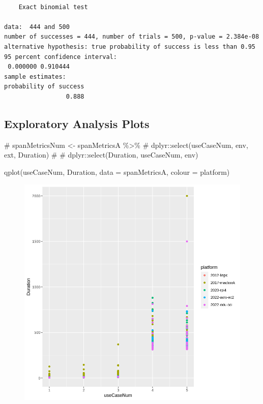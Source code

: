 \documentclass[
  letterpaper,
  DIV=11,
  numbers=noendperiod]{scrartcl}
\newenvironment{Shaded}{\begin{snugshade}}{\end{snugshade}}
\newcommand{\AttributeTok}[1]{\textcolor[rgb]{0.40,0.45,0.13}{#1}}
\newcommand{\CommentTok}[1]{\textcolor[rgb]{0.37,0.37,0.37}{#1}}
\newcommand{\FunctionTok}[1]{\textcolor[rgb]{0.28,0.35,0.67}{#1}}
\newcommand{\NormalTok}[1]{\textcolor[rgb]{0.00,0.23,0.31}{#1}}
\begin{document}
\begin{verbatim}

    Exact binomial test

data:  444 and 500
number of successes = 444, number of trials = 500, p-value = 2.384e-08
alternative hypothesis: true probability of success is less than 0.95
95 percent confidence interval:
 0.000000 0.910444
sample estimates:
probability of success 
                 0.888 
\end{verbatim}

\hypertarget{exploratory-analysis-plots}{%
\subsection{Exploratory Analysis
Plots}\label{exploratory-analysis-plots}}

\begin{Shaded}
\begin{Highlighting}[]
\CommentTok{\# spanMetricsNum \textless{}{-} spanMetricsA \%\textgreater{}\%}
\CommentTok{\#     dplyr::select(useCaseNum, env, ext, Duration)}
\CommentTok{\#     \# dplyr::select(Duration, useCaseNum, env)}
\end{Highlighting}
\end{Shaded}

\begin{Shaded}
\begin{Highlighting}[]
\FunctionTok{qplot}\NormalTok{(useCaseNum, Duration, }\AttributeTok{data =}\NormalTok{ spanMetricsA, }\AttributeTok{colour =}\NormalTok{ platform)}
\end{Highlighting}
\end{Shaded}

\begin{figure}[H]

{\centering \includegraphics{dss-span-analysis-rev5_files/figure-pdf/cell-22-output-1.png}

}

\end{figure}
\end{document}
